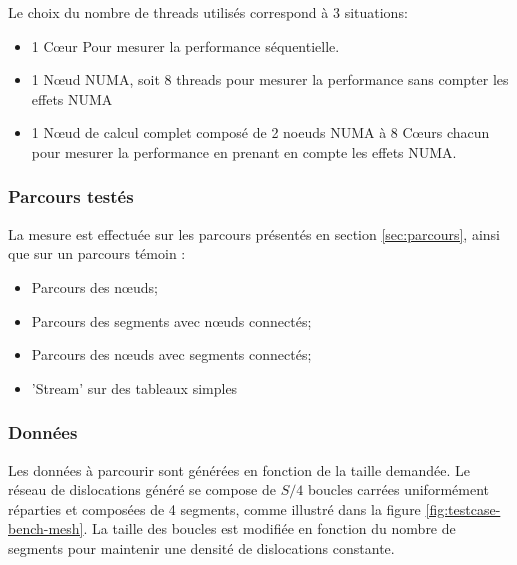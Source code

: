 Le choix du nombre de threads utilisés correspond à 3 situations:
\begin{itemize}
    \item 1 Cœur Pour mesurer la performance séquentielle.
    \item 1 Nœud NUMA, soit 8 threads pour mesurer la performance sans compter les effets NUMA
    \item 1 Nœud de calcul complet composé de 2 noeuds NUMA à 8 Cœurs chacun pour mesurer la performance en prenant en compte les effets NUMA.
\end{itemize}

\subsubsection{Parcours testés}

La mesure est effectuée sur les parcours présentés en section \ref{sec:parcours}, ainsi que sur un parcours témoin :
\begin{itemize}
	\item Parcours des nœuds;
	\item Parcours des segments avec nœuds connectés;
	\item Parcours des nœuds avec segments connectés;
	\item 'Stream' sur des tableaux simples
\end{itemize}

\subsubsection{Données}

Les données à parcourir sont générées en fonction de la taille demandée. Le réseau de dislocations généré se compose de $S/4$ boucles carrées uniformément réparties et composées de 4 segments, comme illustré dans la figure \ref{fig:testcase-bench-mesh}. La taille des boucles est modifiée en fonction du nombre de segments pour maintenir une densité de dislocations constante.

